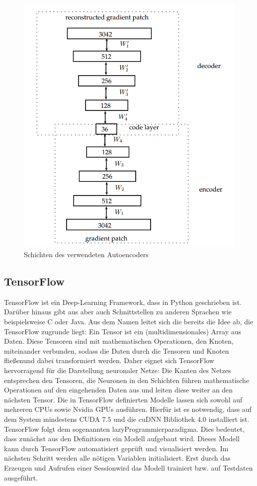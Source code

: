 \begin{figure}
	\centering
	\includegraphics[scale=0.6]{images/ae_model.png}
	\caption{Schichten des verwendeten Autoencoders \cite{aed2016}}
	\label{img:ae_model}
\end{figure}

\subsection{TensorFlow}

TensorFlow ist ein Deep-Learning Framework, dass in Python geschrieben ist. Darüber hinaus gibt aus aber auch Schnittstellen zu anderen Sprachen wie beispielsweise C oder Java. Aus dem Namen leitet sich die bereits die Idee ab, die TensorFlow zugrunde liegt: Ein Tensor ist ein (multidimensionales) Array aus Daten. Diese Tensoren sind mit mathematischen Operationen, den Knoten, miteinander verbunden, sodass die Daten durch die Tensoren und Knoten \grqq fließen\grqq und dabei transformiert werden. Daher eignet sich TensorFlow hervorragend für die Darstellung neuronaler Netze: Die Kanten des Netzes entsprechen den Tensoren, die Neuronen in den Schichten führen mathematische Operationen auf den eingehenden Daten aus und leiten diese weiter an den nächsten Tensor. Die in TensorFlow definierten Modelle lassen sich sowohl auf mehreren CPUs sowie Nvidia GPUs ausführen. Hierfür ist es notwendig, dass auf dem System mindestens CUDA $7.5$ und die cuDNN Bibliothek $4.0$ installiert ist. 
TensorFlow folgt dem sogenannten \glqq lazy\grqq  Programmierparadigma. Dies bedeutet, dass zunächst aus den Definitionen ein Modell aufgebaut wird. Dieses Modell kann durch TensorFlow automatisiert geprüft und visualisiert werden. Im nächsten Schritt werden alle nötigen Variablen initialisiert. Erst durch das Erzeugen und Aufrufen einer \glqq Session\grqq wird das Modell trainiert bzw. auf Testdaten ausgeführt.

